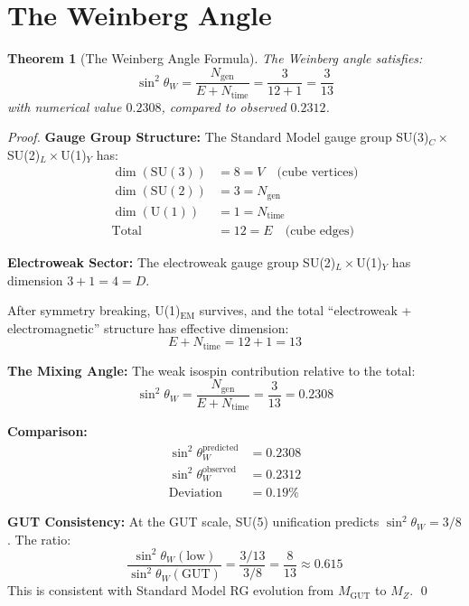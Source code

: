 \documentclass[twocolumn,showpacs,preprintnumbers,amsmath,amssymb,prd]{revtex4-2}
\newtheorem{theorem}{Theorem}[section]
\begin{document}
\section{The Weinberg Angle}

\begin{theorem}[The Weinberg Angle Formula]
\label{thm:weinberg}
The Weinberg angle satisfies:
\begin{equation}
\boxed{\sin^2\theta_W = \frac{N_{\text{gen}}}{E + N_{\text{time}}} = \frac{3}{12 + 1} = \frac{3}{13}}
\end{equation}
with numerical value $0.2308$, compared to observed $0.2312$.
\end{theorem}

\begin{proof}
\textbf{Gauge Group Structure:}
The Standard Model gauge group SU(3)$_C \times$SU(2)$_L \times$U(1)$_Y$ has:
\begin{align}
\dim(\text{SU}(3)) &= 8 = V \quad \text{(cube vertices)} \nonumber\\
\dim(\text{SU}(2)) &= 3 = N_{\text{gen}} \nonumber\\
\dim(\text{U}(1)) &= 1 = N_{\text{time}} \nonumber\\
\text{Total} &= 12 = E \quad \text{(cube edges)}
\end{align}

\textbf{Electroweak Sector:}
The electroweak gauge group SU(2)$_L \times$U(1)$_Y$ has dimension $3 + 1 = 4 = D$.

After symmetry breaking, U(1)$_{\text{EM}}$ survives, and the total ``electroweak + electromagnetic'' structure has effective dimension:
\begin{equation}
E + N_{\text{time}} = 12 + 1 = 13
\end{equation}

\textbf{The Mixing Angle:}
The weak isospin contribution relative to the total:
\begin{equation}
\sin^2\theta_W = \frac{N_{\text{gen}}}{E + N_{\text{time}}} = \frac{3}{13} = 0.2308
\end{equation}

\textbf{Comparison:}
\begin{align}
\sin^2\theta_W^{\text{predicted}} &= 0.2308 \nonumber\\
\sin^2\theta_W^{\text{observed}} &= 0.2312 \nonumber\\
\text{Deviation} &= 0.19\%
\end{align}

\textbf{GUT Consistency:}
At the GUT scale, SU(5) unification predicts $\sin^2\theta_W = 3/8$. The ratio:
\begin{equation}
\frac{\sin^2\theta_W(\text{low})}{\sin^2\theta_W(\text{GUT})} = \frac{3/13}{3/8} = \frac{8}{13} \approx 0.615
\end{equation}
This is consistent with Standard Model RG evolution from $M_{\text{GUT}}$ to $M_Z$.
\qed
\end{proof}
\end{document}
